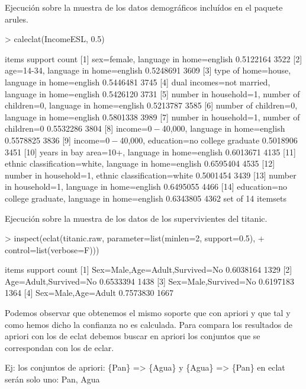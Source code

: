 \documentclass [a4paper] {article}
\begin{document}
Ejecución sobre la muestra de los datos demográficos incluídos en el paquete arules.
\begin{Schunk}
\begin{Sinput}
> caleclat(IncomeESL, 0.5)
\end{Sinput}
\begin{Soutput}
     items                             support count
[1]  {sex=female,                                   
      language in home=english}      0.5122164  3522
[2]  {age=14-34,                                    
      language in home=english}      0.5248691  3609
[3]  {type of home=house,                           
      language in home=english}      0.5446481  3745
[4]  {dual incomes=not married,                     
      language in home=english}      0.5426120  3731
[5]  {number in household=1,                        
      number of children=0,                         
      language in home=english}      0.5213787  3585
[6]  {number of children=0,                         
      language in home=english}      0.5801338  3989
[7]  {number in household=1,                        
      number of children=0}          0.5532286  3804
[8]  {income=$0-$40,000,                            
      language in home=english}      0.5578825  3836
[9]  {income=$0-$40,000,                            
      education=no college graduate} 0.5018906  3451
[10] {years in bay area=10+,                        
      language in home=english}      0.6013671  4135
[11] {ethnic classification=white,                  
      language in home=english}      0.6595404  4535
[12] {number in household=1,                        
      ethnic classification=white}   0.5001454  3439
[13] {number in household=1,                        
      language in home=english}      0.6495055  4466
[14] {education=no college graduate,                
      language in home=english}      0.6343805  4362
set of 14 itemsets 
\end{Soutput}
\end{Schunk}

Ejecución sobre la muestra de los datos de los supervivientes del titanic.
\begin{Schunk}
\begin{Sinput}
> inspect(eclat(titanic.raw, parameter=list(minlen=2, support=0.5),
+                            control=list(verbose=F)))
\end{Sinput}
\begin{Soutput}
    items                            support   count
[1] {Sex=Male,Age=Adult,Survived=No} 0.6038164 1329 
[2] {Age=Adult,Survived=No}          0.6533394 1438 
[3] {Sex=Male,Survived=No}           0.6197183 1364 
[4] {Sex=Male,Age=Adult}             0.7573830 1667 
\end{Soutput}
\end{Schunk}

Podemos observar que obtenemos el mismo soporte que con apriori y que tal y como hemos dicho la confianza no es calculada.
Para compara los resultados de apriori con los de eclat debemos buscar en apriori los conjuntos que se correspondan con los de eclar.

Ej: los conjuntos de apriori: \{Pan\} => \{Agua\} y \{Agua\} => \{Pan\} en eclat serán solo uno: {Pan, Agua}
\end{document}
